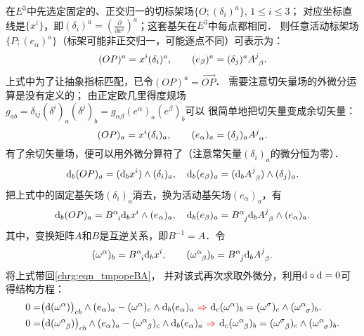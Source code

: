 在$E^3$中先选定固定的、正交归一的切标架场$\{O;(\delta_i)^a\},\, 1\leqslant i \leqslant 3$；
对应坐标直线是$\{x^i\}$，即$(\delta_i)^a= (\frac{\partial}{\partial x^i})^a$；这套基矢在$E^3$中每点都相同．
则任意活动标架场$\{P;(e_\alpha)^a\}$（标架可能非正交归一，可能逐点不同）可表示为：
\begin{equation}
    (OP)^a = x^i (\delta_i)^a,\qquad
    (e_\beta)^a = (\delta_j)^a A^j_{\hphantom{j} \beta} .
\end{equation}
上式中为了让抽象指标匹配，已令$(OP)^a=\overrightarrow{OP}$．
需要注意切矢量场的外微分运算是没有定义的；
由正定欧几里得度规场$g_{ab}=\delta_{ij}(\delta^i)_a (\delta^j)_b
=g_{\alpha\beta}(e^\alpha)_a(e^\beta)_b$可以
很简单地把切矢量变成余切矢量：
\begin{equation}
    (OP)_a = x^i (\delta_i)_a,\qquad
    (e_\alpha)_a = (\delta_j)_a A^j_{\hphantom{j} \alpha} .
\end{equation}
有了余切矢量场，便可以用外微分算符了（注意常矢量$(\delta_i)_a$的微分恒为零）．
\begin{equation}
    {\rm d}_b (OP)_a = ({\rm d}_b x^i) \wedge (\delta_i)_a,\quad
    {\rm d}_b (e_\beta)_a = ({\rm d}_b A^j_{\hphantom{j} \beta}) \wedge  (\delta_j)_a .
\end{equation}
把上式中的固定基矢场$(\delta_i)_a$消去，换为活动基矢场$(e_\alpha)_a$，有
\begin{equation}\label{chrg:eqn_tmpopeBA}
    {\rm d}_b (OP)_a = B^{\alpha}_{\hphantom{\alpha} i} {\rm d}_b x^i \wedge (e_\alpha)_a  ,\quad
    {\rm d}_b (e_\beta)_a = B^{\alpha}_{\hphantom{\alpha} j}{\rm d}_b A^j_{\hphantom{j} \beta} \wedge  (e_\alpha)_a .
\end{equation}
其中，变换矩阵$A$和$B$是互逆关系，即$B^{-1} = A$．令
\begin{equation}\label{chrg:eqn_om324}
    (\omega^\alpha)_b = B^{\alpha}_{\hphantom{\alpha} i} {\rm d}_b x^i,\qquad
    (\omega^{\alpha}_{\hphantom{\alpha} \beta})_b=B^{\alpha}_{\hphantom{\alpha} j}
    {\rm d}_b A^j_{\hphantom{j} \beta} .
\end{equation}
将上式带回\eqref{chrg:eqn_tmpopeBA}，
并对该式再次求取外微分，利用${\rm d}\circ {\rm d}=0$可得结构方程：
\setlength{\mathindent}{0em}
\begin{align}
    0=&\bigl({\rm d} (\omega^\alpha)\bigr)_{cb} \wedge (e_\alpha)_a - (\omega^\alpha)_c \wedge {\rm d}_b(e_\alpha)_a
    {\color{red}\ \Rightarrow \ }
    {\rm d}_c (\omega^\alpha)_b = (\omega^\sigma)_c\wedge (\omega_{\hphantom{\alpha} \sigma}^\alpha)_b . \label{chrg:eqn_jgfc1} \\
    0=&\bigl({\rm d} (\omega^\alpha_{\hphantom{\alpha} \beta})\bigr)_{cb} \wedge  (e_\alpha)_a 
    - (\omega^\alpha_{\hphantom{\alpha} \beta})_c \wedge {\rm d}_b (e_\alpha)_a {\color{red}\ \Rightarrow \ }
    {\rm d}_c (\omega^\alpha_{\hphantom{\alpha} \beta})_b = (\omega^{\sigma}_{\hphantom{\alpha} \beta})_c 
    \wedge (\omega^{\alpha}_{\hphantom{\alpha} \sigma})_b .    \label{chrg:eqn_jgfc2}
\end{align}\setlength{\mathindent}{2em}



